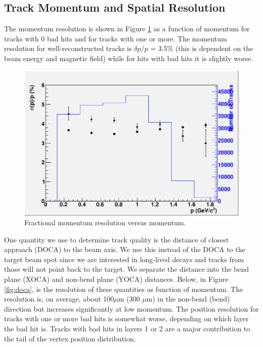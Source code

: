 \subsection{Track Momentum and Spatial Resolution}

The momentum resolution is shown in Figure \ref{fig:trkmom} as a function of momentum for tracks with 
0 bad hits and for tracks with one or more.  The momentum resolution for well-reconstructed 
tracks is $\delta p/p$ = 3.5\% (this is dependent on the beam energy and magnetic field) while for hits with bad hits it is slightly worse. 


\begin{figure}
\includegraphics[scale=0.8]{performance/tracking_performance/momResvsMom.pdf}
\caption{  Fractional momentum resolution versus momentum. } 
\label{fig:trkmom}
\end{figure}


One quantity we use to determine track quality is the distance of closest approach (DOCA) 
to the beam axis.  We use this instead of the DOCA to the target beam spot since we are 
interested in long-lived decays and tracks from those will not point back to the target. 
We separate the distance into the bend plane (XOCA) and non-bend plane (YOCA) distances.  
Below, in Figure \ref{fig:doca}, is the resolution of these quantities as function of momentum.  
The resolution is, on average, about 100$\mu$m (300 $\mu$m) 
in the non-bend (bend) direction but increases significantly at low momentum.  The position 
resolution for tracks with one or more bad hits is somewhat worse, depending on which layer 
the bad hit is.  Tracks with bad hits in 
layers 1 or 2 are a major contribution to the tail of the vertex position distribution. 
    
